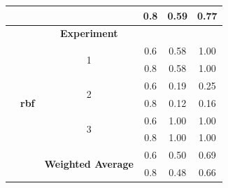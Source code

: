 \documentclass{mpaper}
\begin{document}
\begin{table}[]
\begin{tabular}{|c|c|cccc|}
                                &                       & \multicolumn{1}{c|}{}                                           & \multicolumn{1}{c|}{0.8}                & 0.59                              & 0.77                                \\ \hline
                                &                       & \multicolumn{1}{c|}{\textbf{Experiment}}                        & \multicolumn{1}{c|}{}                   &                                   &                                     \\ \cline{3-6} 
\textbf{}                       & \textbf{}             & \multicolumn{1}{c|}{\multirow{2}{*}{1}}                         & \multicolumn{1}{c|}{0.6}                & 0.58                              & 1.00                                \\
\textbf{}                       & \textbf{}             & \multicolumn{1}{c|}{}                                           & \multicolumn{1}{c|}{0.8}                & 0.58                              & 1.00                                \\ \cline{3-6} 
\textbf{}                       & \textbf{}             & \multicolumn{1}{c|}{\multirow{2}{*}{2}}                         & \multicolumn{1}{c|}{0.6}                & 0.19                              & 0.25                                \\
\textbf{}                       & \textbf{rbf}          & \multicolumn{1}{c|}{}                                           & \multicolumn{1}{c|}{0.8}                & 0.12                              & 0.16                                \\ \cline{3-6} 
\textbf{}                       & \textbf{}             & \multicolumn{1}{c|}{\multirow{2}{*}{3}}                         & \multicolumn{1}{c|}{0.6}                & 1.00                              & 1.00                                \\
\textbf{}                       & \textbf{}             & \multicolumn{1}{c|}{}                                           & \multicolumn{1}{c|}{0.8}                & 1.00                              & 1.00                                \\ \cline{3-6} 
\textbf{}                       & \textbf{}             & \multicolumn{1}{c|}{\multirow{2}{*}{\textbf{Weighted Average}}} & \multicolumn{1}{c|}{0.6}                & 0.50                              & 0.69                                \\
\textbf{}                       & \textbf{}             & \multicolumn{1}{c|}{}                                           & \multicolumn{1}{c|}{0.8}                & 0.48                              & 0.66                                \\ \cline{2-6} 

\end{tabular}
\end{table}
\end{document}
